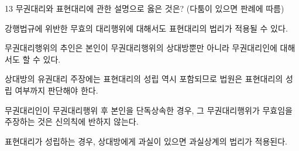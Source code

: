 \begin{question}{13}
무권대리와 표현대리에 관한 설명으로 옳은 것은? (다툼이 있으면 판례에 따름)
\begin{choices}
  \item 강행법규에 위반한 무효의 대리행위에 대해서도 표현대리의 법리가 적용될 수 있다.
  \item 무권대리행위의 추인은 본인이 무권대리행위의 상대방뿐만 아니라 무권대리인에 대해서도 할 수 있다.
  \item 상대방의 유권대리 주장에는 표현대리의 성립 역시 포함되므로 법원은 표현대리의 성립 여부까지 판단해야 한다.
  \item 무권대리인이 무권대리행위 후 본인을 단독상속한 경우, 그 무권대리행위가 무효임을 주장하는 것은 신의칙에 반하지 않는다.
  \item 표현대리가 성립하는 경우, 상대방에게 과실이 있으면 과실상계의 법리가 적용된다.
\end{choices}
\end{question}
